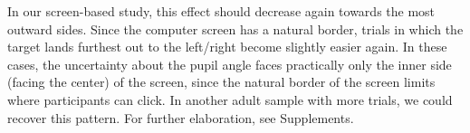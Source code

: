\documentclass[
  man,mask,floatsintext]{apa7}
\begin{document}
In our screen-based study, this effect should decrease again towards the most outward sides. Since the computer screen has a natural border, trials in which the target lands furthest out to the left/right become slightly easier again. In these cases, the uncertainty about the pupil angle faces practically only the inner side (facing the center) of the screen, since the natural border of the screen limits where participants can click. In another adult sample with more trials, we could recover this pattern. For further elaboration, see Supplements.
\end{document}
